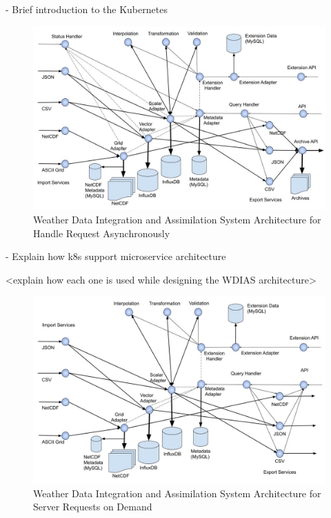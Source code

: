 - Brief introduction to the Kubernetes

\begin{figure}[htp]
    \centering
    \includegraphics[width=1\textwidth]{method/microservice/microservice_architecture-handle_on_async-v3.jpg}
    \caption{Weather Data Integration and Assimilation System Architecture for Handle Request Asynchronously}
    \label{fi:wdias_micro_async}
\end{figure}

- Explain how k8s support microservice architecture

<explain how each one is used while designing the WDIAS architecture>

\begin{figure}[htp]
    \centering
    \includegraphics[width=1\textwidth]{method/microservice/microservice_architecture-handle_on_demand-v3.jpg}
    \caption{Weather Data Integration and Assimilation System Architecture for Server Requests on Demand}
    \label{fi:wdias_micro_on_demand}
\end{figure}

